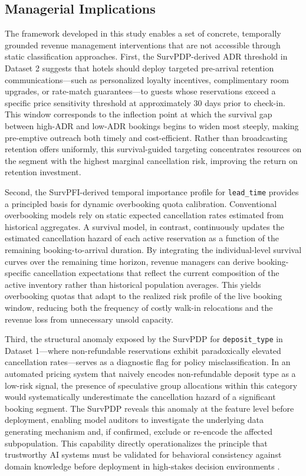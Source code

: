 \documentclass[pdflatex,sn-mathphys-ay]{sn-jnl}
\theoremstyle{thmstyleone}%
\theoremstyle{thmstyletwo}%
\theoremstyle{thmstylethree}%
\begin{document}
\subsection{Managerial Implications}

The framework developed in this study enables a set of concrete, temporally grounded revenue management interventions that are not accessible through static classification approaches. First, the SurvPDP-derived ADR threshold in Dataset 2 suggests that hotels should deploy targeted pre-arrival retention communications—such as personalized loyalty incentives, complimentary room upgrades, or rate-match guarantees—to guests whose reservations exceed a specific price sensitivity threshold at approximately 30 days prior to check-in. This window corresponds to the inflection point at which the survival gap between high-ADR and low-ADR bookings begins to widen most steeply, making pre-emptive outreach both timely and cost-efficient. Rather than broadcasting retention offers uniformly, this survival-guided targeting concentrates resources on the segment with the highest marginal cancellation risk, improving the return on retention investment.

Second, the SurvPFI-derived temporal importance profile for \texttt{lead\_time} provides a principled basis for dynamic overbooking quota calibration. Conventional overbooking models rely on static expected cancellation rates estimated from historical aggregates. A survival model, in contrast, continuously updates the estimated cancellation hazard of each active reservation as a function of the remaining booking-to-arrival duration. By integrating the individual-level survival curves over the remaining time horizon, revenue managers can derive booking-specific cancellation expectations that reflect the current composition of the active inventory rather than historical population averages. This yields overbooking quotas that adapt to the realized risk profile of the live booking window, reducing both the frequency of costly walk-in relocations and the revenue loss from unnecessary unsold capacity.

Third, the structural anomaly exposed by the SurvPDP for \texttt{deposit\_type} in Dataset 1—where non-refundable reservations exhibit paradoxically elevated cancellation rates—serves as a diagnostic flag for policy misclassification. In an automated pricing system that naively encodes non-refundable deposit type as a low-risk signal, the presence of speculative group allocations within this category would systematically underestimate the cancellation hazard of a significant booking segment. The SurvPDP reveals this anomaly at the feature level before deployment, enabling model auditors to investigate the underlying data generating mechanism and, if confirmed, exclude or re-encode the affected subpopulation. This capability directly operationalizes the principle that trustworthy AI systems must be validated for behavioral consistency against domain knowledge before deployment in high-stakes decision environments \citep{thiebes2021trustworthy, meske2022explainable}.
\end{document}
